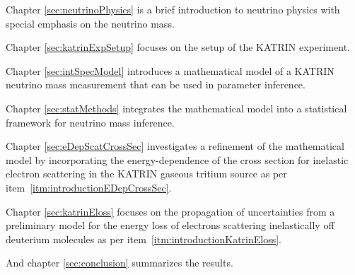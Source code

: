 Chapter \ref{sec:neutrinoPhysics} is a brief introduction to neutrino physics with special emphasis on the neutrino mass.

Chapter \ref{sec:katrinExpSetup} focuses on the setup of the KATRIN experiment.

Chapter \ref{sec:intSpecModel} introduces a mathematical model of a KATRIN neutrino mass measurement that can be used in parameter inference.

Chapter \ref{sec:statMethods} integrates the mathematical model into a statistical framework for neutrino mass inference.

Chapter \ref{sec:eDepScatCrossSec} investigates a refinement of the mathematical model by incorporating the energy-dependence of the cross section for inelastic electron scattering in the KATRIN gaseous tritium source as per item~\ref{itm:introductionEDepCrossSec}.

Chapter \ref{sec:katrinEloss} focuses on the propagation of uncertainties from a preliminary model for the energy loss of electrons scattering inelastically off deuterium molecules as per item~\ref{itm:introductionKatrinEloss}.

And chapter \ref{sec:conclusion} summarizes the results.